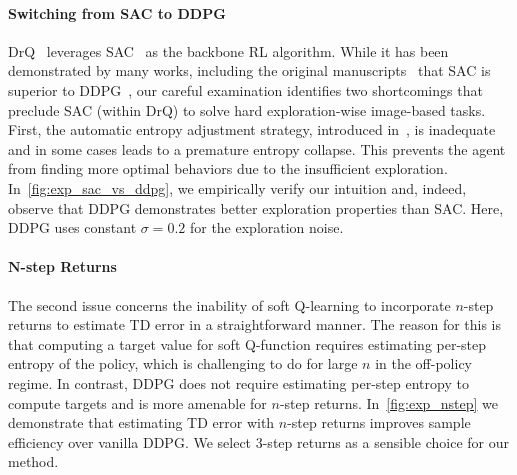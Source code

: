 \paragraph{Switching from SAC to DDPG} DrQ~\citep{yarats2021image} leverages SAC~\citep{haarnoja2018sac} as the backbone RL algorithm. While it has been demonstrated by many works, including the original manuscripts~\citep{haarnoja2018sac,haarnoja2018sacapplication} that SAC is superior to DDPG~\citep{lillicrap2015continuous}, our careful examination identifies two shortcomings that preclude SAC (within DrQ) to solve hard exploration-wise image-based tasks. First, the automatic entropy adjustment strategy, introduced in~\cite{haarnoja2018sacapplication}, is inadequate and in some cases leads to a premature entropy collapse. This prevents the agent from finding more optimal behaviors due to the insufficient exploration. In~\cref{fig:exp_sac_vs_ddpg}, we empirically verify our intuition and, indeed, observe that DDPG demonstrates better exploration properties than SAC. Here, DDPG uses constant $\sigma=0.2$ for the exploration noise.


\paragraph{$\mathbf{N}$-step Returns}
The second issue concerns the inability of soft Q-learning to incorporate $n$-step returns to estimate TD error in a straightforward manner. The reason for this is that computing a target value for soft Q-function requires estimating per-step entropy of the policy, which is challenging to do for large $n$ in the off-policy regime. In contrast, DDPG does not require estimating per-step entropy to compute targets and is more amenable for $n$-step returns. In~\cref{fig:exp_nstep} we demonstrate that estimating TD error with $n$-step returns improves sample efficiency over vanilla DDPG. We select $3$-step returns as a sensible choice for our method.





